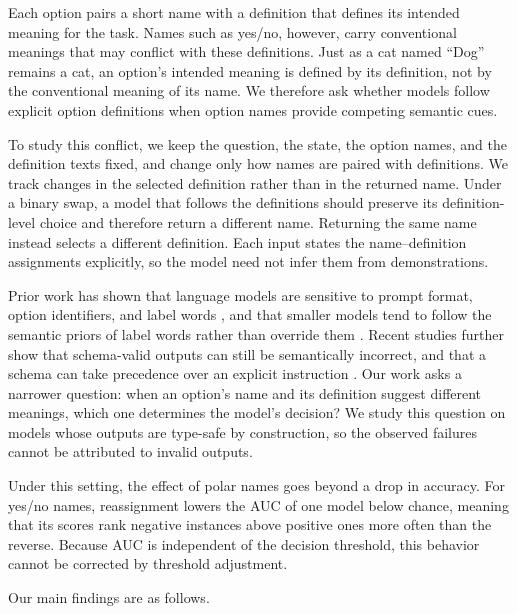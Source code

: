 \documentclass[11pt]{article}
\begin{document}
Each option pairs a short name with a definition that defines its intended meaning for the task. Names such as yes/no, however, carry conventional meanings that may conflict with these definitions.
Just as a cat named ``Dog'' remains a cat, an option's intended meaning
is defined by its definition, not by the conventional meaning of its
name. We therefore ask whether models follow explicit option definitions
when option names provide competing semantic cues.

To study this conflict, we keep the question, the state, the option
names, and the definition texts fixed, and change only how names are
paired with definitions. We track changes in the selected definition
rather than in the returned name. Under a binary swap, a model that
follows the definitions should preserve its definition-level choice
and therefore return a different name. Returning the same name instead
selects a different definition. Each input states the name--definition
assignments explicitly, so the model need not infer them from demonstrations.

Prior work has shown that language models are sensitive to prompt format,
option identifiers, and label words
\citep{sclar2024formatspread,zheng2024mcq,liusie2023wordbias}, and that
smaller models tend to follow the semantic priors of label words rather than
override them \citep{wei2023flipped}. Recent studies further show that
schema-valid outputs can still be semantically incorrect, and that a schema
can take precedence over an explicit instruction
\citep{li2026json,singh2026sob,usman2026phantomfill,yourprompt2026}.
Our work asks a narrower question: when an option's name and its definition
suggest different meanings, which one determines the model's decision?
We study this question on models whose outputs are type-safe by construction,
so the observed failures cannot be attributed to invalid outputs.

Under this setting, the effect of polar names goes beyond a drop in accuracy.
For yes/no names, reassignment lowers the AUC of one model below chance,
meaning that its scores rank negative instances above positive ones more
often than the reverse. Because AUC is independent of the decision threshold,
this behavior cannot be corrected by threshold adjustment.

\noindent Our main findings are as follows.
\end{document}
